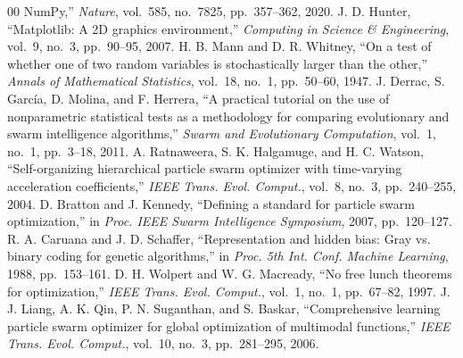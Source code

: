 \documentclass[conference]{IEEEtran}
\begin{document}
\begin{thebibliography}{00}
NumPy,'' \textit{Nature}, vol.~585, no.~7825, pp.~357--362, 2020.
 J. D. Hunter, ``Matplotlib: A 2D graphics
environment,'' \textit{Computing in Science \& Engineering}, vol.~9, no.~3,
pp.~90--95, 2007.
 H. B. Mann and D. R. Whitney, ``On a test of whether one
of two random variables is stochastically larger than the other,''
\textit{Annals of Mathematical Statistics}, vol.~18, no.~1, pp.~50--60,
1947.
 J. Derrac, S. Garc\'{i}a, D. Molina, and F. Herrera,
``A practical tutorial on the use of nonparametric statistical tests as a
methodology for comparing evolutionary and swarm intelligence
algorithms,'' \textit{Swarm and Evolutionary Computation}, vol.~1, no.~1,
pp.~3--18, 2011.
 A. Ratnaweera, S. K. Halgamuge, and H. C. Watson,
``Self-organizing hierarchical particle swarm optimizer with time-varying
acceleration coefficients,'' \textit{IEEE Trans. Evol. Comput.}, vol.~8,
no.~3, pp.~240--255, 2004.
 D. Bratton and J. Kennedy, ``Defining a standard for
particle swarm optimization,'' in \textit{Proc. IEEE Swarm Intelligence
Symposium}, 2007, pp.~120--127.
 R. A. Caruana and J. D. Schaffer, ``Representation and
hidden bias: Gray vs. binary coding for genetic algorithms,'' in
\textit{Proc. 5th Int. Conf. Machine Learning}, 1988, pp.~153--161.
 D. H. Wolpert and W. G. Macready, ``No free lunch
theorems for optimization,'' \textit{IEEE Trans. Evol. Comput.}, vol.~1,
no.~1, pp.~67--82, 1997.
 J. J. Liang, A. K. Qin, P. N. Suganthan, and S. Baskar,
``Comprehensive learning particle swarm optimizer for global optimization
of multimodal functions,'' \textit{IEEE Trans. Evol. Comput.}, vol.~10,
no.~3, pp.~281--295, 2006.
\end{thebibliography}
\end{document}
